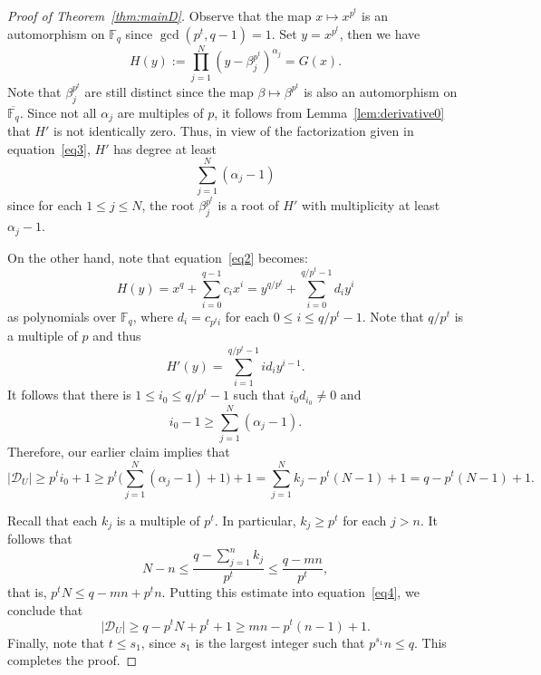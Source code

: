 \documentclass[12pt,reqno]{amsart}
\theoremstyle{definition}
\newcommand{\F}{\mathbb{F}}
\begin{document}
\begin{proof}[Proof of Theorem~\ref{thm:mainD}]
Observe that the map $x \mapsto x^{p^t}$ is an automorphism on $\F_q$ since $\gcd(p^t, q-1)=1$. Set $y=x^{p^t}$, then we have 
\begin{equation} \label{eq3}
H(y):=\prod_{j=1}^N (y-\beta_j^{p^t})^{\alpha_j}=G(x).
\end{equation}
Note that $\beta_j^{p^t}$ are still distinct since the map $\beta \mapsto \beta^{p^t}$ is also an automorphism on $\overline{\F_q}$. Since not all $\alpha_j$ are multiples of $p$, it follows from Lemma~\ref{lem:derivative0} that $H'$ is not identically zero. Thus, in view of the factorization given in equation~\eqref{eq3}, $H'$ has degree at least
$$
\sum_{j=1}^N (\alpha_j-1)
$$
since for each $1 \leq j \leq N$, the root $\beta_j^{p^t}$ is a root of $H'$ with multiplicity at least $\alpha_j-1$.

On the other hand, note that equation~\eqref{eq2} becomes: 
$$
H(y)=x^q+\sum_{i=0}^{q-1} c_ix^i=y^{q/p^t}+\sum_{i=0}^{q/p^t-1} d_iy^i
$$
as polynomials over $\F_q$, where $d_i=c_{p^ti}$ for each $0 \leq i \leq q/p^t-1$. Note that $q/p^t$ is a multiple of $p$ and thus
$$
H'(y)=\sum_{i=1}^{q/p^t-1} id_iy^{i-1}.
$$
It follows that there is $1 \leq i_0 \leq q/p^t-1$ such that $i_0d_{i_0} \neq 0$ and 
$$
i_0-1 \geq \sum_{j=1}^N (\alpha_j-1).
$$
Therefore, our earlier claim implies that
\begin{equation} \label{eq4}
|\mathcal{D}_U|\geq p^ti_0+1 \geq p^t \bigg(\sum_{j=1}^N (\alpha_j-1)+1\bigg)+1=\sum_{j=1}^N k_j -p^t (N-1)+1 =q-p^t(N-1)+1.
\end{equation} 

Recall that each $k_j$ is a multiple of $p^t$. In particular, $k_j \geq p^t$ for each $j>n$. It follows that
$$
N-n \leq \frac{q-\sum_{j=1}^{n} k_j}{p^t} \leq \frac{q-mn}{p^t},
$$
that is, $p^tN \leq q-mn+p^tn$. Putting this estimate into equation~\eqref{eq4}, we conclude that
$$
|\mathcal{D}_U|\geq q-p^tN+p^t+1\geq mn-p^t(n-1)+1.
$$
Finally, note that $t \leq s_1$, since $s_1$ is the largest integer such that $p^{s_1}n \leq q$. This completes the proof.
\end{proof}
\end{document}

